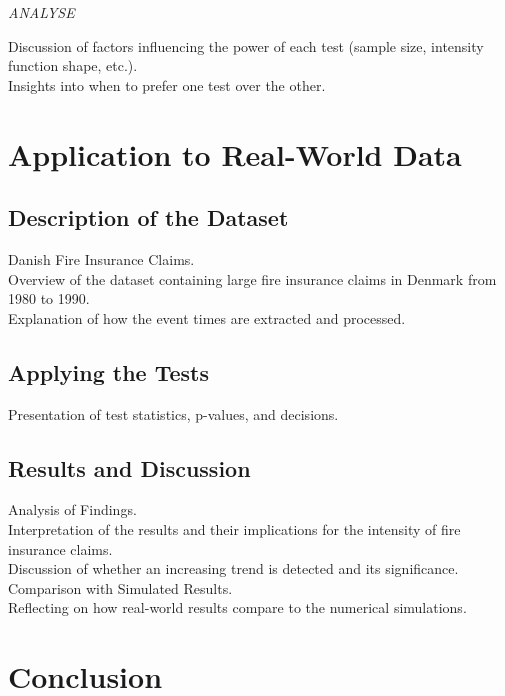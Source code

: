 \documentclass{journalstyle}
\begin{document}
\textit{ANALYSE}

Discussion of factors influencing the power of each test (sample size, intensity function shape, etc.). \\

Insights into when to prefer one test over the other.





\section{Application to Real-World Data}

\subsection{Description of the Dataset}
Danish Fire Insurance Claims. \\
Overview of the dataset containing large fire insurance claims in Denmark from 1980 to 1990. \\
Explanation of how the event times are extracted and processed.

\subsection{Applying the Tests}
Presentation of test statistics, p-values, and decisions. \\

\subsection{Results and Discussion}
Analysis of Findings. \\
Interpretation of the results and their implications for the intensity of fire insurance claims. \\
Discussion of whether an increasing trend is detected and its significance. \\
Comparison with Simulated Results. \\
Reflecting on how real-world results compare to the numerical simulations.



\section{Conclusion}




\printbibliography
\end{document}
